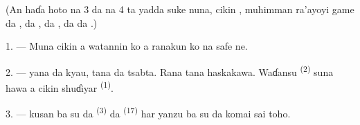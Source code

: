 %

\VUsaut{3.0mm}
\VUsaut{1.6mm}
\VUsaut{3.4mm}

(An haɗa hoto na 3 da na 4 ta yadda suke nuna, cikin , muhimman ra’ayoyi game da , da
, da , da  da
.)

\VUsaut{4.0mm}
\VUsaut{3.0mm}

\VUsaut{2.4mm}

\VUsaut{3.0mm}

1. --- Muna cikin  a watannin 
 ko  a ranakun 
  ko   na safe ne.

2. ---  yana da kyau,  tana da tsabta.
Rana tana haskakawa. Waɗansu 
\textsuperscript{(2)} suna hawa a cikin shuɗiyar 
\textsuperscript{(1)}.

3. ---  kusan ba su da 
 \textsuperscript{(3)} da  \textsuperscript{(17)} har yanzu ba su da komai sai toho.


